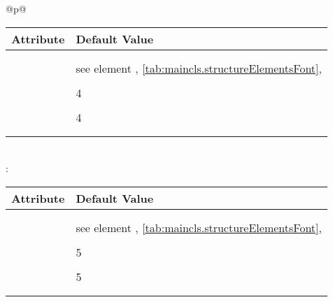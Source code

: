 \begin{longtable}{@{}p{\columnwidth}@{}}
    \begin{tabularx}{\linewidth}{ll}
    \toprule
    Attribute & Default Value \\
    \midrule\nopagebreak
    \PValue{afterskip}   & \PValue{-1em} \\
    \PValue{beforeskip}  & \PValue{3.25ex plus 1ex minus .2ex} \\
    \PValue{font}        & see element \FontElement{paragraph},
                           \autoref{tab:maincls.structureElementsFont}, 
                           \autopageref{tab:maincls.structureElementsFont} \\
    \PValue{indent}      & \PValue{0pt} \\
    \PValue{level}       & 4 \\
    \PValue{tocindent}   & \PValue{10em}\\
    \PValue{toclevel}    & 4 \\
    \PValue{tocnumwidth} & \PValue{5em}\\
    \PValue{tocstyle}    & \PValue{section} \\
    \bottomrule
    \end{tabularx} \\
    \addlinespace[\normalbaselineskip]
    :  \\*
    \begin{tabularx}{\linewidth}{ll}
    \toprule
    Attribute & Default Value \\
    \midrule\nopagebreak
    \PValue{afterskip}   & \PValue{-1em} \\
    \PValue{beforeskip}  & \PValue{3.25ex plus 1ex minus .2ex} \\
    \PValue{font}        & see element \FontElement{subparagraph},
                           \autoref{tab:maincls.structureElementsFont}, 
                           \autopageref{tab:maincls.structureElementsFont} \\
    \PValue{indent}      & \Macro{scr@parindent} \\
    \PValue{level}       & 5 \\
    \PValue{tocindent}   & \PValue{12em}\\
    \PValue{toclevel}    & 5 \\
    \PValue{tocnumwidth} & \PValue{6em}\\
    \PValue{tocstyle}    & \PValue{section} \\
    \bottomrule
    \end{tabularx}
  \end{longtable}
%
\EndIndexGroup


